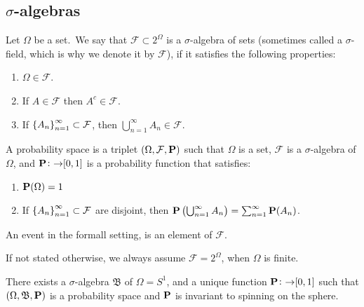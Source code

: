 \documentclass[11pt,a4paper]{article}
\begin{document}
\subsection{\texorpdfstring{$\sigma$}{s}-algebras}
\begin{definition}
  Let $\Omega$ be a set.\ We say that $\mathcal F \subset 2^\Omega$ is a
  $\sigma$-algebra of sets (sometimes called a $\sigma$-field,
  which is why we denote it by $\mathcal F$), if it
  satisfies the following properties:
  \begin{enumerate}
    \item[(1)] $\Omega \in \mathcal F$.
    \item[(2)] If $A \in \mathcal F$ then $A^c \in \mathcal F$.
    \item[(3)] If $\left\{A_n\right\}_{n=1}^{\infty} \subset \mathcal F$, then
      $\bigcup_{n=1}^{\infty}{A_n} \in \mathcal F$.
  \end{enumerate}
\end{definition}

\begin{definition}
  A probability space is a triplet $(\Omega, \mathcal F, \mathbf{P})$ such
  that $\Omega$ is a set, $\mathcal F$ is a $\sigma$-algebra of $\Omega$,
  and $\mathbf{P} \colon \mathcal \to [0,1]$ is a probability function that
  satisfies:
  \begin{enumerate}
    \item[(1)] $\mathbf{P}(\Omega) = 1$
    \item[(2)] If $\left\{A_n\right\}_{n=1}^{\infty} \subset \mathcal F$ are disjoint, then
      $\mathbf{P}\left(\bigcup_{n=1}^{\infty}{A_n}\right) = 
      \sum_{n=1}^{\infty}{\mathbf{P}(A_n)}$.
  \end{enumerate}
\end{definition}

\begin{definition}[Event]
  An event in the formall setting, is an element of $\mathcal F$.
\end{definition}

\begin{remark}
  If not stated otherwise, we always assume $\mathcal F = 2^{\Omega}$,
  when $\Omega$ is finite.
\end{remark}

\begin{proposition}
  There exists a $\sigma$-algebra $\mathfrak B$ of $\Omega = S^1$,
  and a unique
  function $\mathbf{P} \colon \mathfrak \to [0,1]$ such that 
  $(\Omega, \mathfrak B, \mathbf{P})$ is a probability space and $\mathbf{P}$
  is invariant to spinning on the sphere.
\end{proposition}
\end{document}
